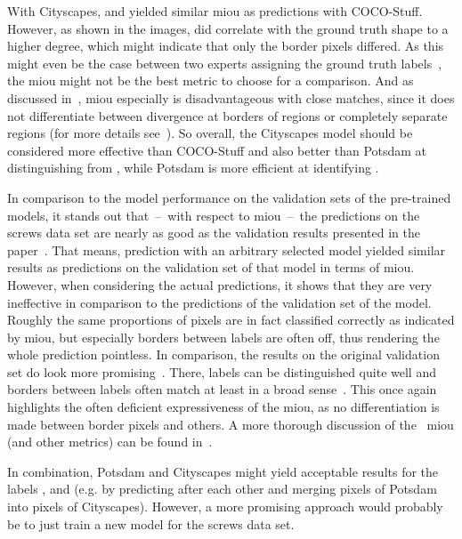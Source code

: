 With Cityscapes,  and  yielded similar \gls{miou} as predictions with COCO-Stuff.
However, as shown in the images,  did correlate with the ground truth shape to a higher degree, which might indicate that only the border pixels differed.
As this might even be the case between two experts assigning the ground truth labels~\autocite{Webb2021}, the \gls{miou} might not be the best metric to choose for a comparison.
And as discussed in~\autocite{Reinke2022}, \gls{miou} especially is disadvantageous with close matches, since it does not differentiate between divergence at borders of regions or completely separate regions (for more details see~\autocite{Reinke2022}).
So overall, the Cityscapes model should be considered more effective than COCO-Stuff and also better than Potsdam at distinguishing  from , while Potsdam is more efficient at identifying .

In comparison to the model performance on the validation sets of the pre-trained models, it stands out that~–~with respect to \gls{miou}~–~the predictions on the screws data set are nearly as good as the validation results presented in the paper~\autocite{Hamilton2022}.
That means, prediction with an arbitrary selected model yielded similar results as predictions on the validation set of that model in terms of \gls{miou}.
However, when considering the actual predictions, it shows that they are very ineffective in comparison to the predictions of the validation set of the model.
Roughly the same proportions of pixels are in fact classified correctly as indicated by \gls{miou}, but especially borders between labels are often off, thus rendering the whole prediction pointless.
In comparison, the results on the original validation set do look more promising~\autocite{Hamilton2022}.
There, labels can be distinguished quite well and borders between labels often match at least in a broad sense~\autocite{Hamilton2022}.
This once again highlights the often deficient expressiveness of the \gls{miou}, as no differentiation is made between border pixels and others.
A more thorough discussion of the ~\gls{miou} (and other metrics) can be found in~\autocite{Reinke2022}.

In combination, Potsdam and Cityscapes might yield acceptable results for the labels , and  (e.g. by predicting after each other and merging  pixels of Potsdam into  pixels of Cityscapes).
However, a more promising approach would probably be to just train a new model for the screws data set.

